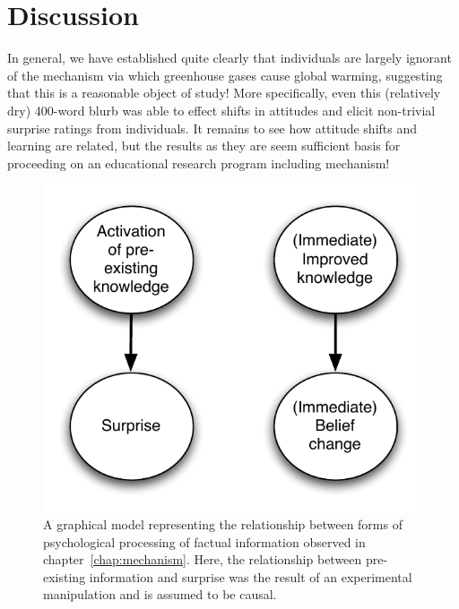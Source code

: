 \section{Discussion}

In general, we have established quite clearly that individuals are largely
ignorant of the mechanism via which greenhouse gases cause global warming,
suggesting that this is a reasonable object of study! More specifically, even
this (relatively dry) 400-word blurb was able to effect shifts in attitudes and
elicit non-trivial surprise ratings from individuals. It remains to see how
attitude shifts and learning are related, but the results as they are seem
sufficient basis for proceeding on an educational research program including
mechanism!



\begin{figure}
    \begin{center}
        \includegraphics{causal2.pdf}
    \end{center}
    \caption{A graphical model representing the relationship between forms of
        psychological processing of factual information observed in
        chapter~\ref{chap:mechanism}. Here, the relationship between pre-existing
        information and surprise was the result of an experimental manipulation and
        is assumed to be causal.}
    \label{fig:causal-mechanism}
\end{figure}

